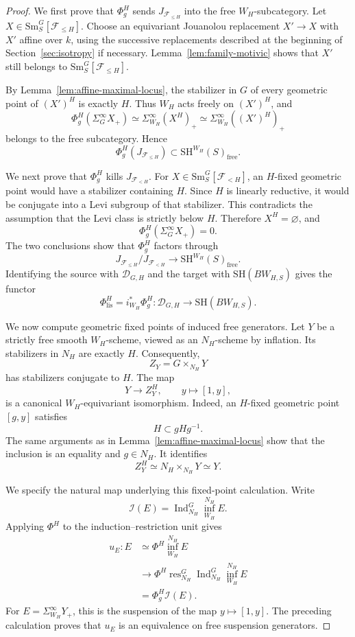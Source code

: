 \documentclass[11pt,reqno]{amsart}
\theoremstyle{definition}
\theoremstyle{remark}
\theoremstyle{plain}
\numberwithin{equation}{section}
\newcommand{\SH}{\mathrm{SH}}
\newcommand{\Sm}{\mathrm{Sm}}
\newcommand{\lis}{\mathrm{lis}}
\newcommand{\free}{\mathrm{free}}
\newcommand{\D}{\mathcal D}
\newcommand{\F}{\mathcal F}
\begin{document}
\begin{proof}

We first prove that \(\Phi_g^H\) sends
\(J_{\F_{\leq H}}\) into the free \(W_H\)-subcategory.
Let \(X\in\Sm^G_S[\F_{\leq H}]\).
Choose an equivariant Jouanolou replacement \(X'\to X\)
with \(X'\) affine over \(k\), using the successive replacements
described at the beginning of Section~\ref{sec:isotropy}
if necessary.
Lemma~\ref{lem:family-motivic} shows that \(X'\) still belongs
to \(\Sm^G_S[\F_{\leq H}]\).

By Lemma~\ref{lem:affine-maximal-locus}, the stabilizer in \(G\)
of every geometric point of \((X')^H\) is exactly \(H\).
Thus \(W_H\) acts freely on \((X')^H\), and
\[
 \Phi_g^H(\Sigma^\infty_GX_+)
 \simeq\Sigma^\infty_{W_H}(X^H)_+
 \simeq\Sigma^\infty_{W_H}((X')^H)_+
\]
belongs to the free subcategory.
Hence
\[
 \Phi_g^H(J_{\F_{\leq H}})
 \subset\SH^{W_H}(S)_{\free}.
\]

We next prove that \(\Phi_g^H\) kills \(J_{\F_{<H}}\).
For \(X\in\Sm^G_S[\F_{<H}]\), an \(H\)-fixed geometric point
would have a stabilizer containing \(H\).
Since \(H\) is linearly reductive, it would be conjugate into
a Levi subgroup of that stabilizer.
This contradicts the assumption that the Levi class is
strictly below \(H\).
Therefore \(X^H=\varnothing\), and
\[
 \Phi_g^H(\Sigma^\infty_GX_+)=0.
\]
The two conclusions show that \(\Phi_g^H\) factors through
\[
 J_{\F_{\leq H}}/J_{\F_{<H}}
 \longrightarrow\SH^{W_H}(S)_{\free}.
\]
Identifying the source with \(\D_{G,H}\) and the target with
\(\SH(BW_{H,S})\) gives the functor
\[
 \Phi_{\lis}^H=i_{W_H}^*\Phi_g^H:
 \D_{G,H}\longrightarrow\SH(BW_{H,S}).
\]

We now compute geometric fixed points of induced free generators.
Let \(Y\) be a strictly free smooth \(W_H\)-scheme, viewed as
an \(N_H\)-scheme by inflation.
Its stabilizers in \(N_H\) are exactly \(H\).
Consequently,
\[
 Z_Y=G\times_{N_H}Y
\]
has stabilizers conjugate to \(H\).
The map
\[
 Y\longrightarrow Z_Y^H,\qquad y\longmapsto[1,y],
\]
is a canonical \(W_H\)-equivariant isomorphism.
Indeed, an \(H\)-fixed geometric point \([g,y]\) satisfies
\[
 H\subset gHg^{-1}.
\]
The same arguments as in Lemma~\ref{lem:affine-maximal-locus} 
show that the inclusion is an equality and \(g\in N_H\).
It identifies
\[
 Z_Y^H\simeq N_H\times_{N_H}Y\simeq Y.
\]

We specify the natural map underlying this fixed-point calculation.
Write
\[
 \mathcal I(E)=
 \operatorname{Ind}_{N_H}^G
 \operatorname{inf}_{W_H}^{N_H}E.
\]
Applying \(\Phi^H\) to the induction--restriction unit gives
\[
 \begin{aligned}
 u_E:E
 &\simeq\Phi^H\operatorname{inf}_{W_H}^{N_H}E\\
 &\longrightarrow
 \Phi^H\operatorname{res}_{N_H}^G
 \operatorname{Ind}_{N_H}^G
 \operatorname{inf}_{W_H}^{N_H}E\\
 &=\Phi_g^H\mathcal I(E).
 \end{aligned}
\]
For \(E=\Sigma^\infty_{W_H}Y_+\), this is the suspension
of the map \(y\mapsto[1,y]\).
The preceding calculation proves that \(u_E\) is an equivalence
on free suspension generators.


\end{proof}
\end{document}
